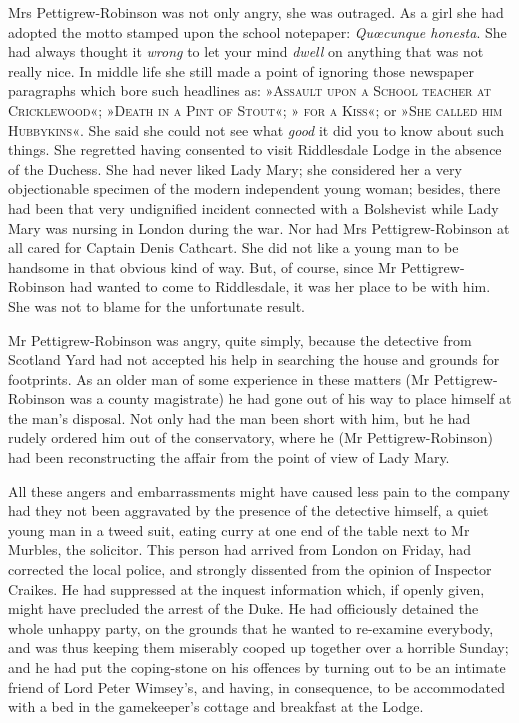 Mrs Pettigrew-Robinson was not only angry, she was outraged. As a girl she had adopted the motto stamped upon the school notepaper: \textit{Quœcunque honesta}. She had always thought it \textit{wrong} to let your mind \textit{dwell} on anything that was not really nice. In middle life she still made a point of ignoring those newspaper paragraphs which bore such headlines as: »\textsc{Assault upon a School teacher at Cricklewood}«; »\textsc{Death in a Pint of Stout}«; »\textsc{ for a Kiss}«; or »\textsc{She called him Hubbykins}«. She said she could not see what \textit{good} it did you to know about such things. She regretted having consented to visit Riddlesdale Lodge in the absence of the Duchess. She had never liked Lady Mary; she considered her a very objectionable specimen of the modern independent young woman; besides, there had been that very undignified incident connected with a Bolshevist while Lady Mary was nursing in London during the war. Nor had Mrs Pettigrew-Robinson at all cared for Captain Denis Cathcart. She did not like a young man to be handsome in that obvious kind of way. But, of course, since Mr  Pettigrew-Robinson had wanted to come to Riddlesdale, it was her place to be with him. She was not to blame for the unfortunate result.

Mr Pettigrew-Robinson was angry, quite simply, because the detective from Scotland Yard had not accepted his help in searching the house and grounds for footprints. As an older man of some experience in these matters (Mr Pettigrew-Robinson was a county magistrate) he had gone out of his way to place himself at the man's disposal. Not only had the man been short with him, but he had rudely ordered him out of the conservatory, where he (Mr Pettigrew-Robinson) had been reconstructing the affair from the point of view of Lady Mary.

All these angers and embarrassments might have caused less pain to the company had they not been aggravated by the presence of the detective himself, a quiet young man in a tweed suit, eating curry at one end of the table next to Mr Murbles, the solicitor. This person had arrived from London on Friday, had corrected the local police, and strongly dissented from the opinion of Inspector Craikes. He had suppressed at the inquest information which, if openly given, might have precluded the arrest of the Duke. He had officiously detained the whole unhappy party, on the grounds that he wanted to re-examine everybody, and was thus keeping them miserably cooped up together over a horrible Sunday; and he had put the coping-stone on his offences by turning out to be an intimate friend of Lord Peter Wimsey's, and having, in consequence, to be accommodated with a bed in the gamekeeper's cottage and breakfast at the Lodge.

